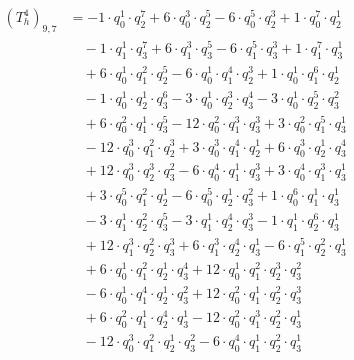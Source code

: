 \begin{align*}(T_{h}^4)_{9,7}&=-1\cdot q_0^{1}\cdot q_2^{7}+6\cdot q_0^{3}\cdot q_2^{5}-6\cdot q_0^{5}\cdot q_2^{3}+1\cdot q_0^{7}\cdot q_2^{1}\\
&\quad -1\cdot q_1^{1}\cdot q_3^{7}+6\cdot q_1^{3}\cdot q_3^{5}-6\cdot q_1^{5}\cdot q_3^{3}+1\cdot q_1^{7}\cdot q_3^{1}\\
&\quad +6\cdot q_0^{1}\cdot q_1^{2}\cdot q_2^{5}-6\cdot q_0^{1}\cdot q_1^{4}\cdot q_2^{3}+1\cdot q_0^{1}\cdot q_1^{6}\cdot q_2^{1}\\
&\quad -1\cdot q_0^{1}\cdot q_2^{1}\cdot q_3^{6}-3\cdot q_0^{1}\cdot q_2^{3}\cdot q_3^{4}-3\cdot q_0^{1}\cdot q_2^{5}\cdot q_3^{2}\\
&\quad +6\cdot q_0^{2}\cdot q_1^{1}\cdot q_3^{5}-12\cdot q_0^{2}\cdot q_1^{3}\cdot q_3^{3}+3\cdot q_0^{2}\cdot q_1^{5}\cdot q_3^{1}\\
&\quad -12\cdot q_0^{3}\cdot q_1^{2}\cdot q_2^{3}+3\cdot q_0^{3}\cdot q_1^{4}\cdot q_2^{1}+6\cdot q_0^{3}\cdot q_2^{1}\cdot q_3^{4}\\
&\quad +12\cdot q_0^{3}\cdot q_2^{3}\cdot q_3^{2}-6\cdot q_0^{4}\cdot q_1^{1}\cdot q_3^{3}+3\cdot q_0^{4}\cdot q_1^{3}\cdot q_3^{1}\\
&\quad +3\cdot q_0^{5}\cdot q_1^{2}\cdot q_2^{1}-6\cdot q_0^{5}\cdot q_2^{1}\cdot q_3^{2}+1\cdot q_0^{6}\cdot q_1^{1}\cdot q_3^{1}\\
&\quad -3\cdot q_1^{1}\cdot q_2^{2}\cdot q_3^{5}-3\cdot q_1^{1}\cdot q_2^{4}\cdot q_3^{3}-1\cdot q_1^{1}\cdot q_2^{6}\cdot q_3^{1}\\
&\quad +12\cdot q_1^{3}\cdot q_2^{2}\cdot q_3^{3}+6\cdot q_1^{3}\cdot q_2^{4}\cdot q_3^{1}-6\cdot q_1^{5}\cdot q_2^{2}\cdot q_3^{1}\\
&\quad +6\cdot q_0^{1}\cdot q_1^{2}\cdot q_2^{1}\cdot q_3^{4}+12\cdot q_0^{1}\cdot q_1^{2}\cdot q_2^{3}\cdot q_3^{2}\\
&\quad -6\cdot q_0^{1}\cdot q_1^{4}\cdot q_2^{1}\cdot q_3^{2}+12\cdot q_0^{2}\cdot q_1^{1}\cdot q_2^{2}\cdot q_3^{3}\\
&\quad +6\cdot q_0^{2}\cdot q_1^{1}\cdot q_2^{4}\cdot q_3^{1}-12\cdot q_0^{2}\cdot q_1^{3}\cdot q_2^{2}\cdot q_3^{1}\\
&\quad -12\cdot q_0^{3}\cdot q_1^{2}\cdot q_2^{1}\cdot q_3^{2}-6\cdot q_0^{4}\cdot q_1^{1}\cdot q_2^{2}\cdot q_3^{1}\end{align*}
